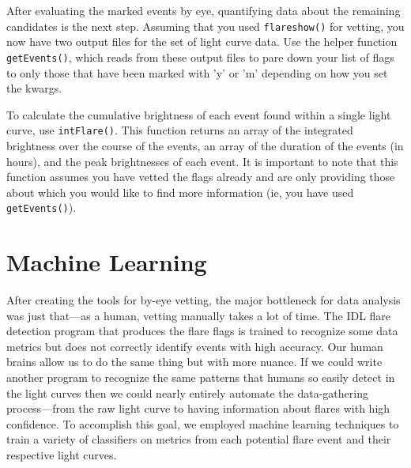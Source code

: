 \documentclass[11pt]{article}
\begin{document}
After evaluating the marked events by eye, quantifying data about the
remaining candidates is the next step.  Assuming that you used
\verb|flareshow()| for vetting, you now have two output files for the
set of light curve data.  Use the helper function \verb|getEvents()|,
which reads from these output files to pare down your list of flags to
only those that have been marked with 'y' or 'm' depending on how you
set the kwargs.

To calculate the cumulative brightness of each event found within a
single light curve, use \verb|intFlare()|.  This function returns an
array of the integrated brightness over the course of the events, an
array of the duration of the events (in hours), and the peak
brightnesses of each event.  It is important to note that this
function assumes you have vetted the flags already and are only
providing those about which you would like to find more information
(ie, you have used \verb|getEvents()|).


\section{Machine Learning}
\label{sec:ml}

After creating the tools for by-eye vetting, the major bottleneck for
data analysis was just that---as a human, vetting manually takes a lot
of time.  The IDL flare detection program that produces the flare
flags is trained to recognize some data metrics but does not correctly
identify events with high accuracy.  Our human brains allow us to do
the same thing but with more nuance.  If we could write another
program to recognize the same patterns that humans so easily detect in
the light curves then we could nearly entirely automate the
data-gathering process---from the raw light curve to having
information about flares with high confidence.  To accomplish this
goal, we employed machine learning techniques to train a variety of
classifiers on metrics from each potential flare event and their
respective light curves.
\end{document}
